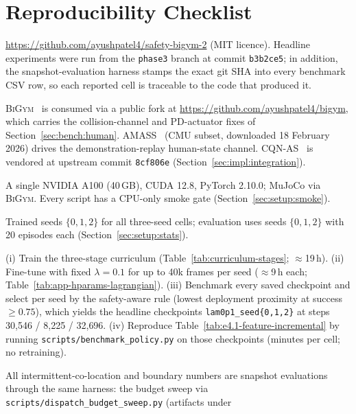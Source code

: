 \documentclass[11pt,a4paper]{report}
\newcommand{\bigym}{\textsc{BiGym}}
\newcommand{\cqnas}{CQN-AS}
\begin{document}
\chapter{Reproducibility Checklist}
\label{app:repro}

\begin{description}[leftmargin=2em,style=nextline]
\item[Code] \url{https://github.com/ayushpatel4/safety-bigym-2} (MIT
  licence). Headline experiments were run from the \texttt{phase3}
  branch at commit \texttt{b3b2ce5}; in addition, the
  snapshot-evaluation harness stamps the exact git SHA into every
  benchmark CSV row, so each reported cell is traceable to the code
  that produced it.
\item[Upstream assets] \bigym{}~\cite{chernyadev2024bigym} is consumed
  via a public fork at \url{https://github.com/ayushpatel4/bigym},
  which carries the collision-channel and PD-actuator fixes of
  Section~\ref{sec:bench:human}. AMASS~\cite{mahmood2019amass} (CMU
  subset, downloaded 18 February 2026) drives the demonstration-replay
  human-state channel. \cqnas{}~\cite{seo2024cqnas} is vendored at
  upstream commit \texttt{8cf806e}
  (Section~\ref{sec:impl:integration}).
\item[Hardware and software] A single NVIDIA A100 (40\,GB), CUDA 12.8,
  PyTorch 2.10.0; MuJoCo via \bigym{}. Every script has a CPU-only
  smoke gate (Section~\ref{sec:setup:smoke}).
\item[Seeds] Trained seeds $\{0, 1, 2\}$ for all three-seed cells;
  evaluation uses seeds $\{0, 1, 2\}$ with 20 episodes each
  (Section~\ref{sec:setup:stats}).
\item[Headline recipe (R1)] (i) Train the three-stage curriculum
  (Table~\ref{tab:curriculum-stages}; $\approx$19\,h). (ii) Fine-tune
  with fixed $\lambda = 0.1$ for up to 40k frames per seed
  ($\approx$9\,h each; Table~\ref{tab:app-hparams-lagrangian}).
  (iii) Benchmark every saved checkpoint and select per seed by the
  safety-aware rule (lowest deployment proximity at success
  $\ge 0.75$), which yields the headline checkpoints
  \texttt{lam0p1\_seed\{0,1,2\}} at steps 30{,}546 / 8{,}225 /
  32{,}696. (iv) Reproduce
  Table~\ref{tab:e4.1-feature-incremental} by running
  \texttt{scripts/benchmark\_policy.py} on those checkpoints
  (minutes per cell; no retraining).
\item[Headline recipe (R2/R3)] All intermittent-co-location and
  boundary numbers are snapshot evaluations through the same
  harness: the budget sweep via
  \texttt{scripts/dispatch\_budget\_sweep.py} (artifacts under

\end{description}
\end{document}

